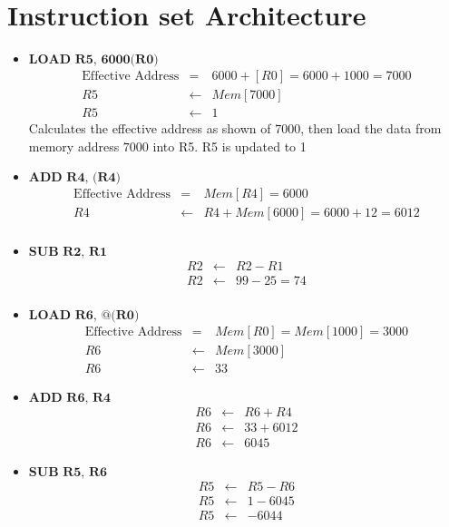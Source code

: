 \documentclass{tufte-handout}
\begin{document}
\section{Instruction set Architecture}
	\begin{itemize}
		\item $\textbf{LOAD R5, 6000(R0)}$
			\begin{eqnarray*}
			\mbox{Effective Address} &=& 6000 + [R0] = 6000 + 1000 = 7000 \\
			R5 &\leftarrow& Mem[7000] \\
			R5 &\leftarrow& 1
			\end{eqnarray*}
			Calculates the effective address as shown of $7000$, then load the data from memory address $7000$ into R5. R5 is updated to 1

		\item $\textbf{ADD R4, (R4)}$
		\begin{eqnarray*}
			\mbox{Effective Address} &=& Mem[R4] = 6000 \\
			R4 &\leftarrow& R4 + Mem[6000] = 6000+12 = 6012 \\
		\end{eqnarray*}
	
		\item $\textbf{SUB R2, R1}$
			\begin{eqnarray*}
				R2 &\leftarrow& R2 - R1 \\
				R2 &\leftarrow& 99 - 25 = 74 \\
			\end{eqnarray*}

		\item $\textbf{LOAD R6, @(R0)}$
			\begin{eqnarray*}
				\mbox{Effective Address} &=& Mem[R0] = Mem[1000] = 3000 \\
				R6 &\leftarrow& Mem[3000] \\
				R6 &\leftarrow& 33
			\end{eqnarray*}

		\item $\textbf{ADD R6, R4}$
			\begin{eqnarray*}
				R6 &\leftarrow& R6 + R4 \\
				R6 &\leftarrow& 33 + 6012 \\
				R6 &\leftarrow& 6045
			\end{eqnarray*}

		\item $\textbf{SUB R5, R6}$
			\begin{eqnarray*}
				R5 &\leftarrow& R5 - R6 \\
				R5 &\leftarrow& 1 - 6045 \\
				R5 &\leftarrow& - 6044 \\
			\end{eqnarray*}


\end{itemize}
\end{document}
